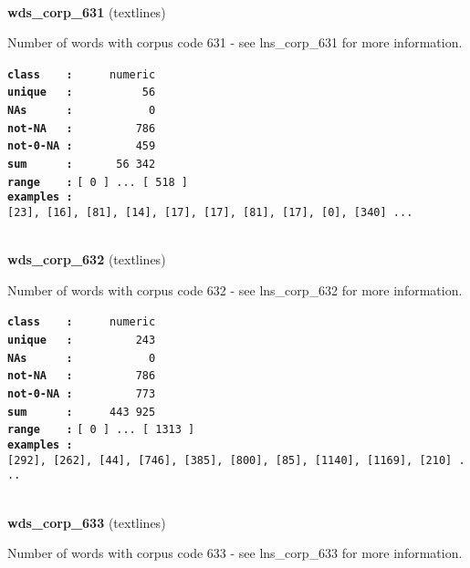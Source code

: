 \documentclass[]{article}
\begin{document}
~

\textbf{wds\_corp\_631} (textlines)

Number of words with corpus code 631 - see lns\_corp\_631 for more
information.

\textbf{\texttt{class\ \ \ \ :}} \texttt{~~~~~numeric}\\
\textbf{\texttt{unique\ \ \ :}} \texttt{~~~~~~~~~~56}\\
\textbf{\texttt{NAs\ \ \ \ \ \ :}} \texttt{~~~~~~~~~~~0}\\
\textbf{\texttt{not-NA\ \ \ :}} \texttt{~~~~~~~~~786}\\
\textbf{\texttt{not-0-NA\ :}} \texttt{~~~~~~~~~459}\\
\textbf{\texttt{sum\ \ \ \ \ \ :}} \texttt{~~~~~~56~342}\\
\textbf{\texttt{range\ \ \ \ :}}
\texttt{{[}\ 0\ {]}\ ...\ {[}\ 518\ {]}}\\
\textbf{\texttt{examples\ :}}
\texttt{{[}23{]},\ {[}16{]},\ {[}81{]},\ {[}14{]},\ {[}17{]},\ {[}17{]},\ {[}81{]},\ {[}17{]},\ {[}0{]},\ {[}340{]}\ ...}\\

~

\textbf{wds\_corp\_632} (textlines)

Number of words with corpus code 632 - see lns\_corp\_632 for more
information.

\textbf{\texttt{class\ \ \ \ :}} \texttt{~~~~~numeric}\\
\textbf{\texttt{unique\ \ \ :}} \texttt{~~~~~~~~~243}\\
\textbf{\texttt{NAs\ \ \ \ \ \ :}} \texttt{~~~~~~~~~~~0}\\
\textbf{\texttt{not-NA\ \ \ :}} \texttt{~~~~~~~~~786}\\
\textbf{\texttt{not-0-NA\ :}} \texttt{~~~~~~~~~773}\\
\textbf{\texttt{sum\ \ \ \ \ \ :}} \texttt{~~~~~443~925}\\
\textbf{\texttt{range\ \ \ \ :}}
\texttt{{[}\ 0\ {]}\ ...\ {[}\ 1313\ {]}}\\
\textbf{\texttt{examples\ :}}
\texttt{{[}292{]},\ {[}262{]},\ {[}44{]},\ {[}746{]},\ {[}385{]},\ {[}800{]},\ {[}85{]},\ {[}1140{]},\ {[}1169{]},\ {[}210{]}\ ...}\\

~

\textbf{wds\_corp\_633} (textlines)

Number of words with corpus code 633 - see lns\_corp\_633 for more
information.
\end{document}
